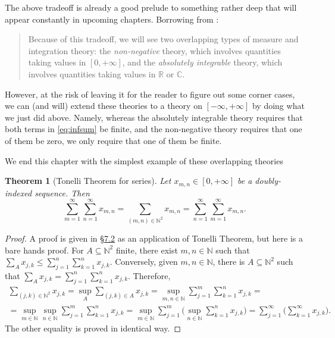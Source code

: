 \documentclass[
]{book}
\newcommand{\C}{\mathbb{C}}
\newcommand{\N}{\mathbb{N}}
\newcommand{\R}{\mathbb{R}}
\renewcommand*{\leq}{\leqslant}
\newtheorem{theorem}{Theorem}[chapter]
\theoremstyle{definition}
\theoremstyle{definition}
\theoremstyle{definition}
\theoremstyle{definition}
\theoremstyle{remark}
\begin{document}
The above tradeoff is already a good prelude to something rather deep
that will appear constantly in upcoming chapters. Borrowing
from \citep{Tao11}:

\begin{quote}
Because of this tradeoff, we will see two overlapping types of measure
and integration theory: the \emph{non-negative} theory, which involves
quantities taking values in \([0, +\infty]\), and the \emph{absolutely
integrable} theory, which involves quantities taking values in \(\R\) or
\(\C\).
\end{quote}

However, at the risk of leaving it for the reader to figure out some
corner cases, we can (and will) extend these theories to a theory on
\([-\infty,+\infty]\) by doing what we just did above. Namely, whereas the
absolutely integrable theory requires that both terms
in \eqref{eq:infsum} be finite, and the non-negative theory requires
that one of them be zero, we only require that one of them be finite.

We end this chapter with the simplest example of these overlapping
theories

\begin{theorem}[Tonelli Theorem for series]
\protect\hypertarget{thm:seriestonelli}{}\label{thm:seriestonelli}Let \(x_{m,n} \in [0,+\infty]\) be a doubly-indexed sequence. Then
\[\sum_{m=1}^\infty
\sum_{n=1}^\infty
x_{m,n}
=
\sum_{(m,n)\in\N^2} x_{m,n}
=
\sum_{n=1}^\infty
\sum_{m=1}^\infty
x_{m,n}
.\]
\end{theorem}

\begin{proof}
A proof is given in §\protect\hyperlink{sub:fubini}{7.2} as an application of Tonelli Theorem, but here
is a bare hands proof. For \(A \subseteq \N^2\) finite, there exist
\(m,n\in\N\) such that
\(\sum_{A}x_{j,k} \leq \sum_{j=1}^n \sum_{k=1}^n x_{j,k}\). Conversely,
given \(m,n\in\N\), there is \(A \subseteq \N^2\) such that
\(\sum_{A} x_{j,k} = \sum_{j=1}^n \sum_{k=1}^n x_{j,k}\). Therefore,
\[\begin{gathered}
\sum_{(j,k)\in\N^2} x_{j,k}
=
\sup_A \sum_{(j,k)\in A} x_{j,k}
=
\sup_{m,n\in\N} \sum_{j=1}^m \sum_{k=1}^n x_{j,k}
=
\\
=
\sup_{m\in\N}
\sup_{n\in\N}
\sum_{j=1}^m \sum_{k=1}^n x_{j,k}
=
\sup_{m\in\N} \sum_{j=1}^m
\Big(
\sup_{n\in\N} \sum_{k=1}^n
x_{j,k}
\Big)
=
\sum_{j=1}^\infty
\Big(
\sum_{k=1}^\infty
x_{j,k}
\Big)
%
.\end{gathered}\] The other equality is proved in identical way.
\end{proof}
\end{document}
